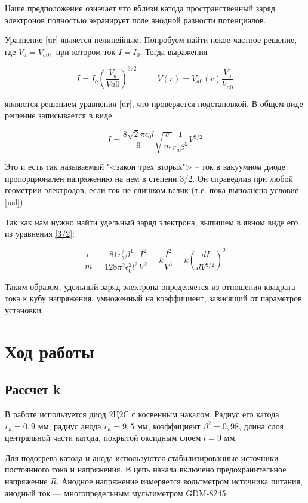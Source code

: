 \documentclass[a4paper, 12pt]{article}%
\begin{document}
	Наше предположение означает что вблизи катода пространственный заряд электронов полностью экранирует поле анодной разности потенциалов.
	
	Уравнение \eqref{ur} является нелинейным. Попробуем  найти некое частное решение, где $ V_a = V_{a0}, $ при котором ток $ I = I_0 $. Тогда выражения 
	
	\begin{equation}\label{}
		I = I_o \left( \dfrac{V_a}{V{a0}} \right) ^{3/2}, \qquad V(r) = V_{a0}(r)\dfrac{V_a}{V_{a0}}
	\end{equation}
	
	являются решением уравнения \eqref{ur}, что проверяется подстановкой. В общем виде решение записывается в виде
	
	\begin{equation}\label{3/2}
		I = \dfrac{8\sqrt{2}\pi \epsilon_0 l}{9}\sqrt{\dfrac{e}{m}}\dfrac{1}{r_a\beta^2} V^{3/2}
	\end{equation}
	
	Это и есть так называемый "<закон трех вторых"> -- ток в вакуумном диоде пропорционален напряжению на нем в степени 3/2. Он справедлив при любой геометрии электродов, если ток не слишком велик (т.е. пока выполнено условие \eqref{usl}). 
	
	Так как нам нужно найти удельный заряд электрона, выпишем в явном виде его из уравнения \eqref{3/2}:
	
	\begin{equation}\label{e/m}
		\dfrac{e}{m} = \dfrac{81r_a^2\beta^4}{128\pi^2\epsilon_0^2l^2}  \dfrac{I^2}{V^2} = k  \dfrac{I^2}{V^3} = k (\frac{dI}{dV^{3/2}})^2
	\end{equation}
	
	Таким образом, удельный заряд электрона определяется из отношения квадрата тока к кубу напряжения, умноженный на коэффициент, зависящий от параметров установки.
	\section{Ход работы}
	\subsection{Рассчет k}
	В работе используется диод 2Ц2С с косвенным накалом. Радиус его катода $ r_k = 0,9 $ мм, радиус анода $ r_a = 9,5  $ мм, коэффициент $ \beta^2 = 0,98 $, длина слоя центральной части катода, покрытой оксидным слоем $ l = 9 $ мм.
	
	Для подогрева катода и анода используются стабилизированные источники постоянного тока и напряжения. В цепь накала включено предохранительное напряжение $ R $. Анодное напряжение измеряется вольтметром источника питания, анодный ток --- многопредельным мультиметром GDM-8245. 
	
\end{document}
